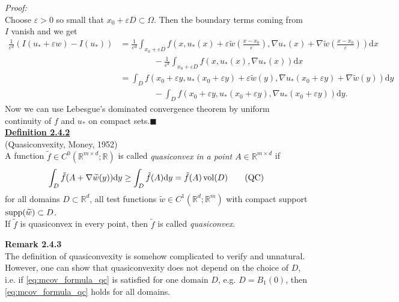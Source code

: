 \textit{Proof:}\\
Choose $\varepsilon>0$ so small that $x_0+\varepsilon D\subset\Omega$. Then the boundary terms coming from $I$ vanish and we get
\begin{align*}
	\frac{1}{\varepsilon^d}(I(u_*+\varepsilon w)-I(u_*))&=\frac{1}{\varepsilon^d}\int_{x_0+\varepsilon D}{f\left(x,u_*(x)+\varepsilon\widetilde{w}\left(\frac{x-x_0}{\varepsilon}\right),\nabla u_*(x)+\nabla\widetilde{w}\left(\frac{x-x_0}{\varepsilon}\right)\right)\mathrm{d}x}\\
	&\qquad\qquad-\frac{1}{\varepsilon^d}\int_{x_0+\varepsilon D}{f(x,u_*(x),\nabla u_*(x))\mathrm{d}x}\\
	&=\int_D{f(x_0+\varepsilon y,u_*(x_0+\varepsilon y)+\varepsilon\widetilde{w}(y),\nabla u_*(x_0+\varepsilon y)+\nabla\widetilde{w}(y))\mathrm{d}y}\\
	&\qquad\qquad-\int_D{f(x_0+\varepsilon y,u_*(x_0+\varepsilon y),\nabla u_*(x_0+\varepsilon y))\mathrm{d}y}.
\end{align*}
Now we can use Lebesgue's dominated convergence theorem by uniform continuity of $f$ and $u_*$ on compact sets.\hfill$\blacksquare$\\[11pt]

\hypertarget{definition_2_4_2}{\textbf{\underline{Definition 2.4.2}}}\\
(Quasiconvexity, Money, 1952)\\
A function $\tilde{f}\in C^0(\mathbb{R}^{m\times d};\mathbb{R})$ is called \textit{quasiconvex in a point $A\in\mathbb{R}^{m\times d}$} if
\begin{align}\label{eq:mcov_formula_qc}
	\int_D{\tilde{f}(A+\nabla\widetilde{w}(y))\mathrm{d}y}\geq\int_D{\tilde{f}(A)\mathrm{d}y}=\tilde{f}(A)\operatorname{vol}\mathopen{}\left(D\right)\mathclose{}\tag{QC}
\end{align}
for all domains $D\subset\mathbb{R}^d$, all test functions $\widetilde{w}\in C^1(\mathbb{R}^d;\mathbb{R}^m)$ with compact support $\operatorname{supp}\mathopen{}\left(\widetilde{w}\right)\mathclose{}\subset D$.\\

If $\tilde{f}$ is quasiconvex in every point, then $\tilde{f}$ is called \textit{quasiconvex}.\newpage

\textbf{Remark 2.4.3}\\
The definition of quasiconvexity is somehow complicated to verify and unnatural. However, one can show that quasiconvexity does not depend on the choice of $D$, i.e. if \eqref{eq:mcov_formula_qc} is satisfied for one domain $D$, e.g. $D=B_1(0)$, then \eqref{eq:mcov_formula_qc} holds for all domains.\\[11pt]

